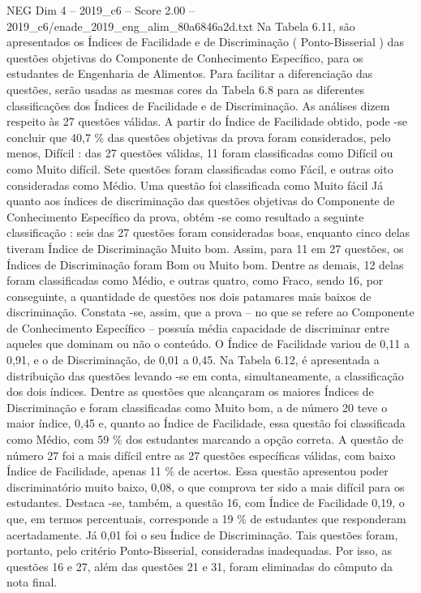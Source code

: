 \begin{textsample}{NEG Dim 4 – 2019\_c6 – Score 2.00 – 2019\_c6/enade\_2019\_eng\_alim\_80a6846a2d.txt}
Na Tabela 6.11, são apresentados os Índices de Facilidade e de Discriminação ( Ponto-Bisserial ) das questões objetivas do Componente de Conhecimento Específico, para os estudantes de Engenharia de Alimentos.
Para facilitar a diferenciação das questões, serão usadas as mesmas cores da Tabela 6.8 para as diferentes classificações dos Índices de Facilidade e de Discriminação.
As análises dizem respeito às 27 questões válidas.
A partir do Índice de Facilidade obtido, pode -se concluir que 40,7 \% das questões objetivas da prova foram considerados, pelo menos, Difícil : das 27 questões válidas, 11 foram classificadas como Difícil ou como Muito difícil.
Sete questões foram classificadas como Fácil, e outras oito consideradas como Médio.
Uma questão foi classificada como Muito fácil Já quanto aos índices de discriminação das questões objetivas do Componente de Conhecimento Específico da prova, obtém -se como resultado a seguinte classificação : seis das 27 questões foram consideradas boas, enquanto cinco delas tiveram Índice de Discriminação Muito bom.
Assim, para 11 em 27 questões, os Índices de Discriminação foram Bom ou Muito bom.
Dentre as demais, 12 delas foram classificadas como Médio, e outras quatro, como Fraco, sendo 16, por conseguinte, a quantidade de questões nos dois patamares mais baixos de discriminação.
Constata -se, assim, que a prova – no que se refere ao Componente de Conhecimento Específico – possuía média capacidade de discriminar entre aqueles que dominam ou não o conteúdo.
O Índice de Facilidade variou de 0,11 a 0,91, e o de Discriminação, de 0,01 a 0,45.
Na Tabela 6.12, é apresentada a distribuição das questões levando -se em conta, simultaneamente, a classificação dos dois índices.
Dentre as questões que alcançaram os maiores Índices de Discriminação e foram classificadas como Muito bom, a de número 20 teve o maior índice, 0,45 e, quanto ao Índice de Facilidade, essa questão foi classificada como Médio, com 59 \% dos estudantes marcando a opção correta.
A questão de número 27 foi a mais difícil entre as 27 questões específicas válidas, com baixo Índice de Facilidade, apenas 11 \% de acertos.
Essa questão apresentou poder discriminatório muito baixo, 0,08, o que comprova ter sido a mais difícil para os estudantes.
Destaca -se, também, a questão 16, com Índice de Facilidade 0,19, o que, em termos percentuais, corresponde a 19 \% de estudantes que responderam acertadamente.
Já 0,01 foi o seu Índice de Discriminação.
Tais questões foram, portanto, pelo critério Ponto-Bisserial, consideradas inadequadas.
Por isso, as questões 16 e 27, além das questões 21 e 31, foram eliminadas do cômputo da nota final.

\end{textsample}
